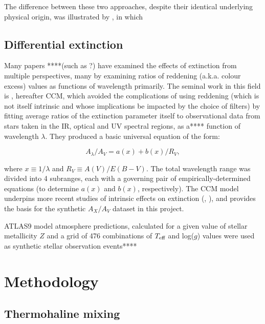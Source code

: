 \documentclass[usenatbib]{mnras}
\begin{document}
The difference between these two approaches, despite their identical underlying physical origin, was illustrated by \citet{2010ApJ...723..563D}, in which 

\subsection{Differential extinction}
Many papers ****(such as ?) have examined the effects of extinction from multiple perspectives, many by examining ratios of reddening (a.k.a. colour excess) values as functions of wavelength primarily. The seminal work in this field is \cite{1989ApJ...345..245C}, hereafter CCM, which avoided the complications of using reddening (which is not itself intrinsic and whose implications be impacted by the choice of filters) by fitting average ratios of the extinction parameter itself to observational data from stars taken in the IR, optical and UV spectral regions, as a**** function of wavelength $\lambda$. They produced a basic universal equation of the form:

\begin{equation}
A_{\lambda}/A_{V} = a(x) + b(x)/R_{V},
\label{CCM_general}
\end{equation}

where $x \equiv 1/\lambda$ and $R_{V} \equiv A(V)/E(B-V)$. The total wavelength range was divided into 4 subranges, each with a governing pair of empirically-determined equations (to determine $a(x)$ and $b(x)$, respectively). The CCM model underpins more recent studies of intrinsic effects on extinction (\citet{2018MNRAS.479L.102C}, \citet{2008PASP..120..583G}), and provides the basis for the synthetic  $A_{X}/A_{V}$ dataset in this project.

ATLAS9 model atmosphere predictions, calculated for a given value of stellar metallicity $Z$ and a grid of 476 combinations of $T_{\textnormal{eff}}$ and log($g$) values \citep{2004astro.ph..5087C} were used as synthetic stellar observation events****

\section{Methodology} \label{Methodology}
\subsection{Thermohaline mixing}
\end{document}
